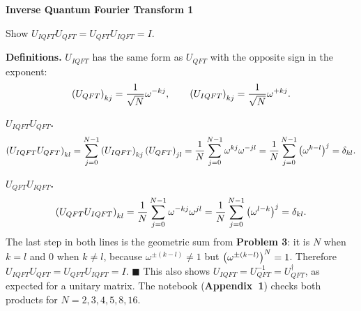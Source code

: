 \documentclass[a4paper, 10pt]{article}
\begin{document}
\begin{problem}
\textbf{Inverse Quantum Fourier Transform 1}
\par Show \( U_{IQFT}U_{QFT} = U_{QFT}U_{IQFT} = I \).
\end{problem}

\begin{solution}
	\noindent \textbf{Definitions.} \( U_{IQFT} \) has the same form as \( U_{QFT} \) with the opposite sign in the exponent:
	\[
		\left(U_{QFT}\right)_{kj} = \frac{1}{\sqrt{N}}\omega^{-kj}, \qquad \left(U_{IQFT}\right)_{kj} = \frac{1}{\sqrt{N}}\omega^{+kj}.
	\]

	\myspace

	\noindent \textbf{\( U_{IQFT}U_{QFT} \).}
	\[
		\left(U_{IQFT}U_{QFT}\right)_{kl} = \sum_{j = 0}^{N - 1}\left(U_{IQFT}\right)_{kj}\left(U_{QFT}\right)_{jl} = \frac{1}{N}\sum_{j = 0}^{N - 1}\omega^{kj}\omega^{-jl} = \frac{1}{N}\sum_{j = 0}^{N - 1}\left(\omega^{k - l}\right)^{j} = \delta_{kl}.
	\]

	\noindent \textbf{\( U_{QFT}U_{IQFT} \).}
	\[
		\left(U_{QFT}U_{IQFT}\right)_{kl} = \frac{1}{N}\sum_{j = 0}^{N - 1}\omega^{-kj}\omega^{jl} = \frac{1}{N}\sum_{j = 0}^{N - 1}\left(\omega^{l - k}\right)^{j} = \delta_{kl}.
	\]
	The last step in both lines is the geometric sum from \textbf{Problem 3}: it is \( N \) when \( k = l \) and \( 0 \) when \( k \neq l \), because \( \omega^{\pm(k - l)} \neq 1 \) but \( \left(\omega^{\pm(k - l)}\right)^N = 1 \).
	Therefore \( U_{IQFT}U_{QFT} = U_{QFT}U_{IQFT} = I \). \( \blacksquare \)
	This also shows \( U_{IQFT} = U_{QFT}^{-1} = U_{QFT}^{\dagger} \), as expected for a unitary matrix. The notebook (\textbf{Appendix~1}) checks both products for \( N = 2, 3, 4, 5, 8, 16 \).
\end{solution}
\end{document}
